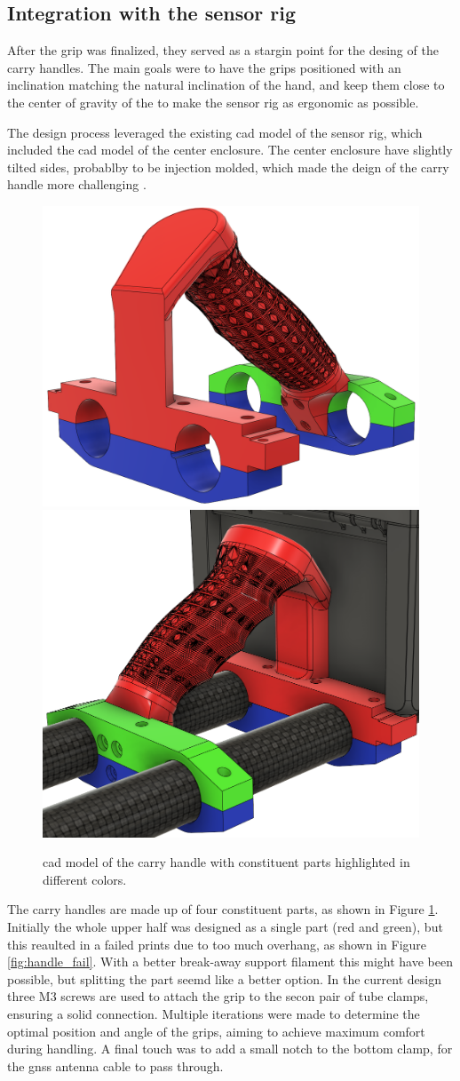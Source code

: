 \subsection{Integration with the sensor rig}
After the grip was finalized, they served as a stargin point for the desing of the carry handles.
The main goals were to have the grips positioned with an inclination matching the natural inclination of the hand, and keep them close to the center of gravity of the \sr to make the sensor rig as ergonomic as possible.

The design process leveraged the existing cad model of the sensor rig, which included the cad model of the center enclosure.
The center enclosure have slightly tilted sides, probablby to be injection molded, which made the deign of the carry handle more challenging \cite{booplaEnclosure}.

\begin{figure}[H]
    \centering
    \includegraphics[width=.48\textwidth]{figures/3d_print/handle_cad.png}
    \includegraphics[width=.48\textwidth]{figures/3d_print/handle_cad_2.png}
    \caption{\gls{cad} model of the carry handle with constituent parts highlighted in different colors.}
    \label{fig:constituent_parts}
\end{figure}

The carry handles are made up of four constituent parts, as shown in Figure \ref{fig:constituent_parts}.
Initially the whole upper half was designed as a single part (red and green), but this reaulted in a failed prints due to too much overhang, as shown in Figure \ref{fig:handle_fail}.
With a better break-away support filament this might have been possible, but splitting the part seemd like a better option.
In the current design three M3 screws are used to attach the grip to the secon pair of tube clamps, ensuring a solid connection.
Multiple iterations were made to determine the optimal position and angle of the grips, aiming to achieve maximum comfort during handling.
A final touch was to add a small notch to the bottom clamp, for the \gls{gnss} antenna cable to pass through.

